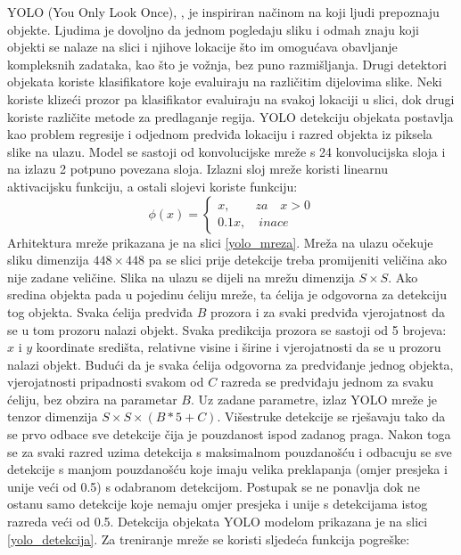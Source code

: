YOLO (You Only Look Once), \cite{DBLP:journals/corr/RedmonDGF15}, je inspiriran načinom na koji ljudi prepoznaju objekte. Ljudima je dovoljno da jednom pogledaju sliku i odmah znaju koji objekti se nalaze na slici i njihove lokacije što im omogućava obavljanje kompleksnih zadataka, kao što je vožnja, bez puno razmišljanja. 
Drugi detektori objekata koriste klasifikatore koje evaluiraju na različitim dijelovima slike. Neki koriste klizeći prozor pa klasifikator evaluiraju na svakoj lokaciji u slici, dok drugi koriste različite metode za predlaganje regija. YOLO detekciju objekata postavlja kao problem regresije i odjednom predviđa lokaciju i razred objekta iz piksela slike na ulazu. Model se sastoji od konvolucijske mreže s 24 konvolucijska sloja i na izlazu 2 potpuno povezana sloja. Izlazni sloj mreže koristi linearnu aktivacijsku funkciju, a ostali slojevi koriste funkciju:
\[
	\phi (x) = 
	\begin{cases}
		x, \quad \quad za \quad x > 0 \\
		0.1x, \quad inace
	\end{cases}
\]
 Arhitektura mreže prikazana je na slici \ref{yolo_mreza}. Mreža na ulazu očekuje sliku dimenzija $448 \times 448$ pa se slici prije detekcije treba promijeniti veličina ako nije zadane veličine. Slika na ulazu se dijeli na mrežu dimenzija $S \times S$. Ako sredina objekta pada u pojedinu ćeliju mreže, ta ćelija je odgovorna za detekciju tog objekta. Svaka ćelija predviđa $B$ prozora i za svaki predviđa vjerojatnost da se u tom prozoru nalazi objekt. Svaka predikcija prozora se sastoji od 5 brojeva: $x$ i $y$ koordinate središta, relativne visine i širine i vjerojatnosti da se u prozoru nalazi objekt. Budući da je svaka ćelija odgovorna za predviđanje jednog objekta, vjerojatnosti pripadnosti svakom od $C$ razreda se predviđaju jednom za svaku ćeliju, bez obzira na parametar $B$. Uz zadane parametre, izlaz YOLO mreže je tenzor dimenzija $S \times S \times (B \ast 5 + C)$. Višestruke detekcije se rješavaju tako da se prvo odbace sve detekcije čija je pouzdanost ispod zadanog praga. Nakon toga se za svaki razred uzima detekcija s maksimalnom pouzdanošću i odbacuju se sve detekcije s manjom pouzdanošću koje imaju velika preklapanja (omjer presjeka i unije veći od 0.5) s odabranom detekcijom. Postupak se ne ponavlja dok ne ostanu samo detekcije koje nemaju omjer presjeka i unije s detekcijama istog razreda veći od 0.5. Detekcija objekata YOLO modelom prikazana je na slici \ref{yolo_detekcija}. Za treniranje mreže se koristi sljedeća funkcija pogreške:
